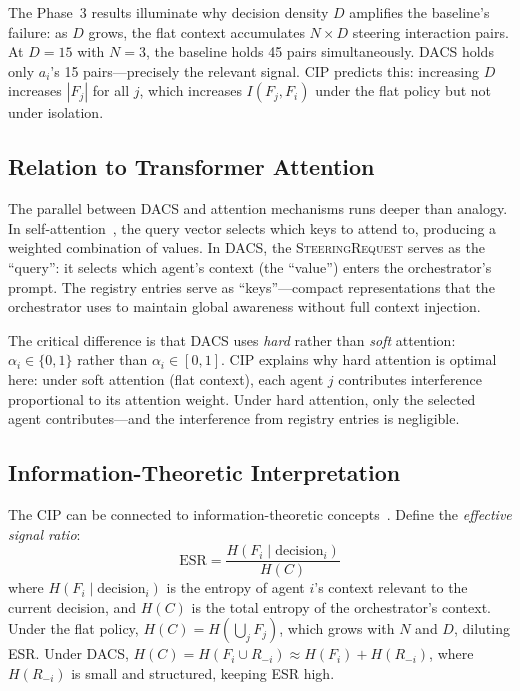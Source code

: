 \documentclass{article}
\begin{document}
The Phase~3 results illuminate why decision density $D$ amplifies
the baseline's failure: as $D$ grows, the flat context accumulates
$N \times D$ steering interaction pairs.
At $D{=}15$ with $N{=}3$, the baseline holds 45 pairs simultaneously.
DACS holds only $a_i$'s 15 pairs---precisely the relevant signal.
CIP predicts this: increasing $D$ increases $|F_j|$ for all $j$,
which increases $I(F_j, F_i)$ under the flat policy but not under
isolation.

\subsection{Relation to Transformer Attention}

The parallel between DACS and attention mechanisms runs deeper than
analogy.
In self-attention~\citep{vaswani2017attention}, the query vector
selects which keys to attend to, producing a weighted combination
of values.
In DACS, the \textsc{SteeringRequest} serves as the ``query'':
it selects which agent's context (the ``value'') enters the
orchestrator's prompt.
The registry entries serve as ``keys''---compact representations
that the orchestrator uses to maintain global awareness without
full context injection.

The critical difference is that DACS uses \emph{hard} rather than
\emph{soft} attention: $\alpha_i \in \{0, 1\}$ rather than
$\alpha_i \in [0, 1]$.
CIP explains why hard attention is optimal here:
under soft attention (flat context), each agent $j$ contributes
interference proportional to its attention weight.
Under hard attention, only the selected agent contributes---and
the interference from registry entries is negligible.

\subsection{Information-Theoretic Interpretation}

The CIP can be connected to information-theoretic
concepts~\citep{shannon1948mathematical, cover2006elements}.
Define the \emph{effective signal ratio}:
\begin{equation}
  \text{ESR} = \frac{H(F_i \mid \text{decision}_i)}{H(C)}
\end{equation}
where $H(F_i \mid \text{decision}_i)$ is the entropy of agent $i$'s
context relevant to the current decision, and $H(C)$ is the total
entropy of the orchestrator's context.
Under the flat policy, $H(C) = H(\bigcup_j F_j)$, which grows with $N$
and $D$, diluting ESR.
Under DACS, $H(C) = H(F_i \cup R_{-i}) \approx H(F_i) + H(R_{-i})$,
where $H(R_{-i})$ is small and structured, keeping ESR high.
\end{document}
